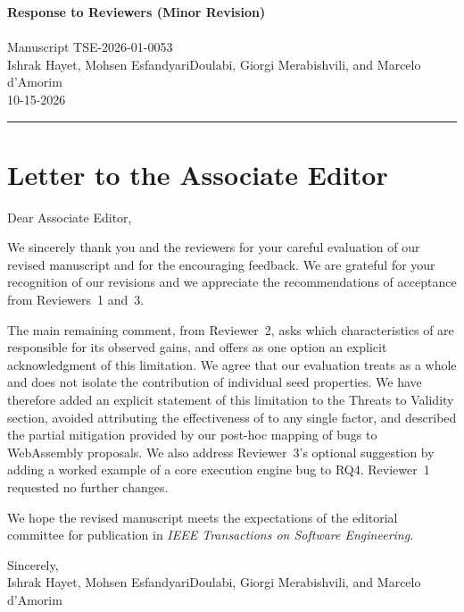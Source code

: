 \documentclass[11pt]{article}
\newcommand{\manuscriptID}{TSE-2026-01-0053}
\newcommand{\authorList}{Ishrak Hayet, Mohsen EsfandyariDoulabi, Giorgi Merabishvili, and Marcelo d'Amorim}
\newcommand{\aeName}{Associate Editor}
\begin{document}
\begin{center}
    {\LARGE\bfseries Response to Reviewers (Minor Revision)}\\[10pt]
    {\Large \PaperTitle{}}\\[8pt]
    {\large Manuscript \manuscriptID{}}\\[8pt]
    \authorList\\[6pt]
    \textsc{10-15-2026}
\end{center}

\vspace{1em}
\hrule
\vspace{1.5em}

\section*{Letter to the Associate Editor}

Dear \aeName{},

We sincerely thank you and the reviewers for your careful evaluation of our revised manuscript and for the encouraging feedback. We are grateful for your recognition of our revisions and we appreciate the recommendations of acceptance from Reviewers~1 and~3.

The main remaining comment, from Reviewer~2, asks which characteristics of \rtbench{} are responsible for its observed gains, and offers as one option an explicit acknowledgment of this limitation. We agree that our evaluation treats \rtbench{} as a whole and does not isolate the contribution of individual seed properties. We have therefore added an explicit statement of this limitation to the Threats to Validity section, avoided attributing the effectiveness of \rtbench{} to any single factor, and described the partial mitigation provided by our post-hoc mapping of bugs to WebAssembly proposals. We also address Reviewer~3's optional suggestion by adding a worked example of a core execution engine bug to RQ4. Reviewer~1 requested no further changes.

We hope the revised manuscript meets the expectations of the editorial committee for publication in \emph{IEEE Transactions on Software Engineering}.

\vspace{1em}
Sincerely,\\
\authorList
\end{document}
